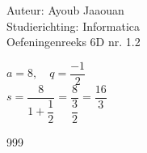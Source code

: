 \documentclass[a4paper]{article}
\begin{document}
\noindent \large Auteur: Ayoub Jaaouan \\
\noindent \large Studierichting: Informatica\\
\noindent \large Oefeningenreeks 6D nr. 1.2\\
\medskip

\normalsize

	
$a = 8,\quad q = \dfrac{-1}{2}$\\

$s = \dfrac{8}{1 + \dfrac{1}{2}} = \dfrac{8}{\dfrac{3}{2}} = \dfrac{16}{3}$


\begin{thebibliography}{999}
\end{thebibliography}
\end{document}

